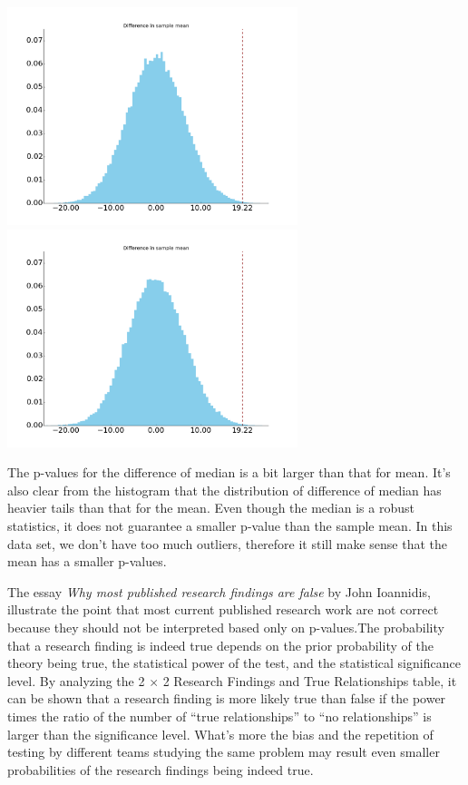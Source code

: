 \documentclass[11pt]{article}
\newenvironment{problem}[2][Problem]{\begin{trivlist}
\item[\hskip \labelsep {\bfseries #1}\hskip \labelsep {\bfseries #2.}]}{\end{trivlist}}
\begin{document}
\begin{centering}
 \includegraphics[height =2.5in]{figure_3}\includegraphics[height =2.5in]{figure_5}
 \end{centering}
 
 The p-values for the difference of median is a bit larger than that for mean. It's also clear from the histogram that the distribution of difference of median has heavier tails than that for the mean. Even though the median is a robust statistics, it does not guarantee a smaller p-value than the sample mean. In this data set, we don't have too much outliers, therefore it still make sense that  the mean has a smaller p-values.

\begin{problem}{5}
\end{problem}
 The essay \textit{Why most published research findings  are false} by John Ioannidis, illustrate the point that most current published research work are not correct because they should not be interpreted based only on p-values.The probability that a research finding is indeed true depends on the prior probability of the theory  being true, the statistical power of the test, and the statistical significance level. By analyzing the 2 $\times$ 2 Research Findings and True Relationships table, it can be shown that a research finding is more likely true than  false  if the power times  the ratio of the number of “true relationships” to “no relationships”  is larger than the significance level. What's more the bias and the repetition of testing by different teams studying the same problem may result even smaller probabilities of the research findings being indeed true. 
\end{document}
